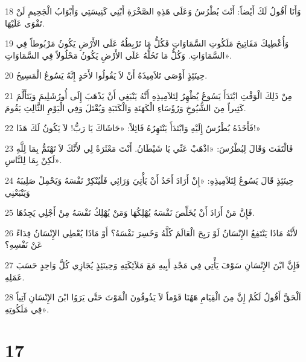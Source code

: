 \par 18 وَأَنَا أَقُولُ لَكَ أَيْضاً: أَنْتَ بُطْرُسُ وَعَلَى هَذِهِ الصَّخْرَةِ أَبْنِي كَنِيسَتِي وَأَبْوَابُ الْجَحِيمِ لَنْ تَقْوَى عَلَيْهَا.
\par 19 وَأُعْطِيكَ مَفَاتِيحَ مَلَكُوتِ السَّمَاوَاتِ فَكُلُّ مَا تَرْبِطُهُ عَلَى الأَرْضِ يَكُونُ مَرْبُوطاً فِي السَّمَاوَاتِ. وَكُلُّ مَا تَحُلُّهُ عَلَى الأَرْضِ يَكُونُ مَحْلُولاً فِي السَّمَاوَاتِ».
\par 20 حِينَئِذٍ أَوْصَى تَلاَمِيذَهُ أَنْ لاَ يَقُولُوا لأَحَدٍ إِنَّهُ يَسُوعُ الْمَسِيحُ.
\par 21 مِنْ ذَلِكَ الْوَقْتِ ابْتَدَأَ يَسُوعُ يُظْهِرُ لِتَلاَمِيذِهِ أَنَّهُ يَنْبَغِي أَنْ يَذْهَبَ إِلَى أُورُشَلِيمَ وَيَتَأَلَّمَ كَثِيراً مِنَ الشُّيُوخِ وَرُؤَسَاءِ الْكَهَنَةِ وَالْكَتَبَةِ وَيُقْتَلَ وَفِي الْيَوْمِ الثَّالِثِ يَقُومَ.
\par 22 فَأَخَذَهُ بُطْرُسُ إِلَيْهِ وَابْتَدَأَ يَنْتَهِرُهُ قَائِلاً: «حَاشَاكَ يَا رَبُّ! لاَ يَكُونُ لَكَ هَذَا!»
\par 23 فَالْتَفَتَ وَقَالَ لِبُطْرُسَ: «اذْهَبْ عَنِّي يَا شَيْطَانُ. أَنْتَ مَعْثَرَةٌ لِي لأَنَّكَ لاَ تَهْتَمُّ بِمَا لِلَّهِ لَكِنْ بِمَا لِلنَّاسِ».
\par 24 حِينَئِذٍ قَالَ يَسُوعُ لِتَلاَمِيذِهِ: «إِنْ أَرَادَ أَحَدٌ أَنْ يَأْتِيَ وَرَائِي فَلْيُنْكِرْ نَفْسَهُ وَيَحْمِلْ صَلِيبَهُ وَيَتْبَعْنِي
\par 25 فَإِنَّ مَنْ أَرَادَ أَنْ يُخَلِّصَ نَفْسَهُ يُهْلِكُهَا وَمَنْ يُهْلِكُ نَفْسَهُ مِنْ أَجْلِي يَجِدُهَا.
\par 26 لأَنَّهُ مَاذَا يَنْتَفِعُ الإِنْسَانُ لَوْ رَبِحَ الْعَالَمَ كُلَّهُ وَخَسِرَ نَفْسَهُ؟ أَوْ مَاذَا يُعْطِي الإِنْسَانُ فِدَاءً عَنْ نَفْسِهِ؟
\par 27 فَإِنَّ ابْنَ الإِنْسَانِ سَوْفَ يَأْتِي فِي مَجْدِ أَبِيهِ مَعَ مَلاَئِكَتِهِ وَحِينَئِذٍ يُجَازِي كُلَّ وَاحِدٍ حَسَبَ عَمَلِهِ.
\par 28 اَلْحَقَّ أَقُولُ لَكُمْ إِنَّ مِنَ الْقِيَامِ هَهُنَا قَوْماً لاَ يَذُوقُونَ الْمَوْتَ حَتَّى يَرَوُا ابْنَ الإِنْسَانِ آتِياً فِي مَلَكُوتِهِ».

\chapter{17}

